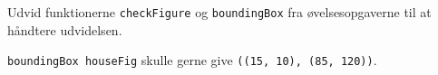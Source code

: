 Udvid funktionerne \texttt{checkFigure} og
  \texttt{boundingBox} fra øvelsesopgaverne til at håndtere
  udvidelsen.

  \texttt{boundingBox houseFig} skulle gerne give \texttt{((15, 10), (85,
    120))}.